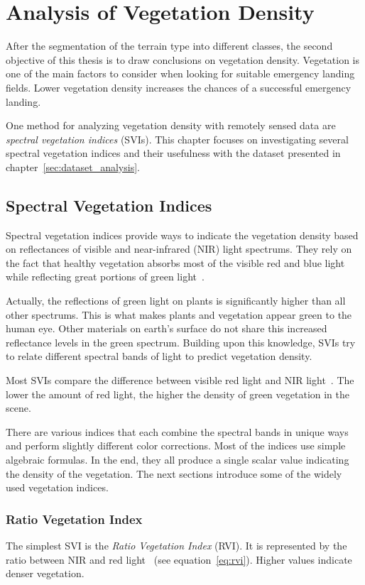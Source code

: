 \section{Analysis of Vegetation Density}
\label{sec:vegetation_analysis}
After the segmentation of the terrain type into different classes, the second objective of this thesis is to draw conclusions on vegetation density. Vegetation is one of the main factors to consider when looking for suitable emergency landing fields. Lower vegetation density increases the chances of a successful emergency landing.

One method for analyzing vegetation density with remotely sensed data are \emph{spectral vegetation indices} (SVIs). This chapter focuses on investigating several spectral vegetation indices and their usefulness with the dataset presented in chapter~\ref{sec:dataset_analysis}.

\subsection{Spectral Vegetation Indices}
Spectral vegetation indices provide ways to indicate the vegetation density based on reflectances of visible and near-infrared (NIR) light spectrums. They rely on the fact that healthy vegetation absorbs most of the visible red and blue light while reflecting great portions of green light~\cite{glv03}.

Actually, the reflections of green light on plants is significantly higher than all other spectrums. This is what makes plants and vegetation appear green to the human eye. Other materials on earth's surface do not share this increased reflectance levels in the green spectrum. Building upon this knowledge, SVIs try to relate different spectral bands of light to predict vegetation density.

Most SVIs compare the difference between visible red light and NIR light~\cite{glv03}. The lower the amount of red light, the higher the density of green vegetation in the scene.

There are various indices that each combine the spectral bands in unique ways and perform slightly different color corrections. Most of the indices use simple algebraic formulas. In the end, they all produce a single scalar value indicating the density of the vegetation. The next sections introduce some of the widely used vegetation indices.

\subsubsection{Ratio Vegetation Index}
The simplest SVI is the \emph{Ratio Vegetation Index} (RVI). It is represented by the ratio between NIR and red light~\cite{glv03} (see equation~\ref{eq:rvi}). Higher values indicate denser vegetation.


